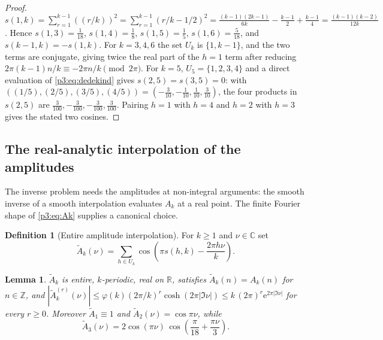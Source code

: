 \documentclass[11pt,a4paper,oneside]{book}
\theoremstyle{plain}
\newtheorem{lemma}[theorem]{Lemma}
\theoremstyle{definition}
\newtheorem{definition}[theorem]{Definition}
\theoremstyle{remark}
\newcommand{\Int}{\mathbb{Z}}
\newcommand{\Real}{\mathbb{R}}
\newcommand{\Cplx}{\mathbb{C}}
\newcommand{\e}{\mathrm{e}}
\begin{document}
\begin{proof}
$s(1,k)=\sum_{r=1}^{k-1}((r/k))^{2}=\sum_{r=1}^{k-1}(r/k-1/2)^{2}
=\frac{(k-1)(2k-1)}{6k}-\frac{k-1}{2}+\frac{k-1}{4} =\frac{(k-1)(k-2)}{12k}$. Hence
$s(1,3)=\frac1{18}$, $s(1,4)=\frac18$, $s(1,5)=\frac15$, $s(1,6)=\frac5{18}$, and
$s(k-1,k)=-s(1,k)$. For $k=3,4,6$ the set $U_{k}$ is $\{1,k-1\}$, and the two terms are conjugate,
giving twice the real part of the $h=1$ term after reducing $2\pi(k-1)n/k\equiv-2\pi n/k
\pmod{2\pi}$. For $k=5$, $U_{5}=\{1,2,3,4\}$ and a direct evaluation of \cref{p3:eq:dedekind}
gives $s(2,5)=s(3,5)=0$: with
$((1/5),(2/5),(3/5),(4/5))=(-\tfrac3{10},-\tfrac1{10},\tfrac1{10},\tfrac3{10})$, the four products
in $s(2,5)$ are $\tfrac3{100},-\tfrac3{100},-\tfrac3{100},\tfrac3{100}$. Pairing $h=1$ with $h=4$
and $h=2$ with $h=3$ gives the stated two cosines.
\end{proof}

\subsection{The real-analytic interpolation of the amplitudes}
\label{p3:sub:interpolation-amplitudes}

The inverse problem needs the amplitudes at non-integral arguments: the smooth inverse of a smooth
interpolation evaluates $A_{k}$ at a real point. The finite Fourier shape of \cref{p3:eq:Ak}
supplies a canonical choice.

\begin{definition}[Entire amplitude interpolation]\label{p3:def:Atilde}
For $k\ge1$ and $\nu\in\Cplx$ set
\begin{equation}\label{p3:eq:Atilde}
 \widetilde A_{k}(\nu)=\sum_{h\in U_{k}}
 \cos\!\left(\pi s(h,k)-\frac{2\pi h\nu}{k}\right).
\end{equation}
\end{definition}

\begin{lemma}\label{p3:lem:Atilde}
$\widetilde A_{k}$ is entire, $k$-periodic, real on $\Real$, satisfies $\widetilde
A_{k}(n)=A_{k}(n)$ for $n\in\Int$, and $|\widetilde
A_{k}^{(r)}(\nu)|\le\varphi(k)(2\pi/k)^{r}\cosh(2\pi|\Im\nu|) \le k\,(2\pi)^{r}\e^{2\pi|\Im\nu|}$
for every $r\ge0$. Moreover $\widetilde A_{1}\equiv1$ and $\widetilde A_{2}(\nu)=\cos\pi\nu$,
while
\begin{equation}\label{p3:eq:Atilde3}
 \widetilde A_{3}(\nu)=2\cos(\pi\nu)\,
 \cos\!\left(\frac\pi{18}+\frac{\pi\nu}{3}\right).
\end{equation}
\end{lemma}
\end{document}
